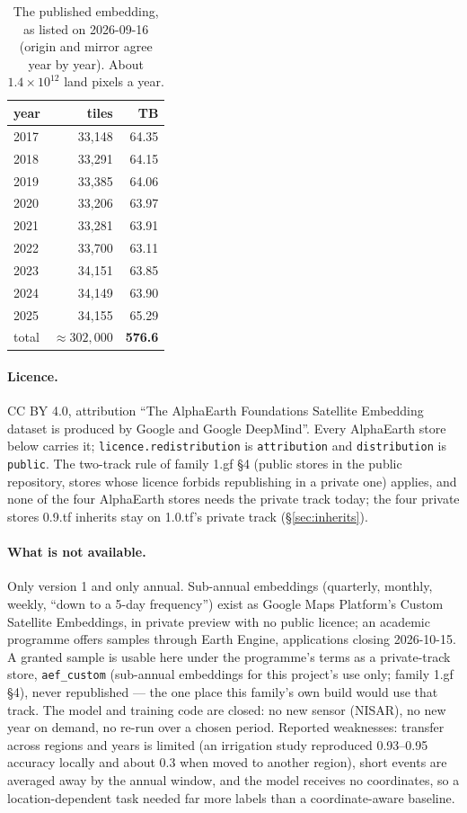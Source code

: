 \documentclass[10pt]{article}
\newcommand{\code}[1]{\texttt{#1}}
\begin{document}
\begin{table}[H]
\centering\footnotesize
\begin{tabular}{@{}lrr@{}}
\toprule
year & tiles & TB \\
\midrule
2017 & 33,148 & 64.35 \\
2018 & 33,291 & 64.15 \\
2019 & 33,385 & 64.06 \\
2020 & 33,206 & 63.97 \\
2021 & 33,281 & 63.91 \\
2022 & 33,700 & 63.11 \\
2023 & 34,151 & 63.85 \\
2024 & 34,149 & 63.90 \\
2025 & 34,155 & 65.29 \\
\midrule
total & $\approx 302{,}000$ & \textbf{576.6} \\
\bottomrule
\end{tabular}
\caption{The published embedding, as listed on 2026-09-16 (origin and mirror agree year by year). About $1.4 \times 10^{12}$ land pixels a year.}
\end{table}

\paragraph{Licence.} CC BY 4.0, attribution ``The AlphaEarth Foundations
Satellite Embedding dataset is produced by Google and Google DeepMind''.
Every AlphaEarth store below carries it; \code{licence.redistribution} is
\code{attribution} and \code{distribution} is \code{public}. The two-track
rule of family 1.gf \S4 (public stores in the public repository, stores whose licence forbids republishing in a private one) applies, and none of the four AlphaEarth stores needs the
private track today; the four private stores 0.9.tf inherits stay on 1.0.tf's private track (\S\ref{sec:inherits}).

\paragraph{What is not available.} Only version 1 and only annual. Sub-annual
embeddings (quarterly, monthly, weekly, ``down to a 5-day frequency'') exist
as Google Maps Platform's Custom Satellite Embeddings, in private preview
with no public licence; an academic programme offers samples through Earth
Engine, applications closing 2026-10-15. A granted sample is usable here under the programme's terms as a
private-track store, \code{aef\_custom} (sub-annual embeddings for this project's use only; family 1.gf \S4), never
republished --- the one place this family's own build would use that track. The model and training code are
closed: no new sensor (NISAR), no new year on demand, no re-run over a
chosen period. Reported weaknesses: transfer across regions and years is
limited (an irrigation study reproduced 0.93--0.95 accuracy locally and
about 0.3 when moved to another region), short events are averaged away by
the annual window, and the model receives no coordinates, so a
location-dependent task needed far more labels than a coordinate-aware
baseline.
\end{document}
